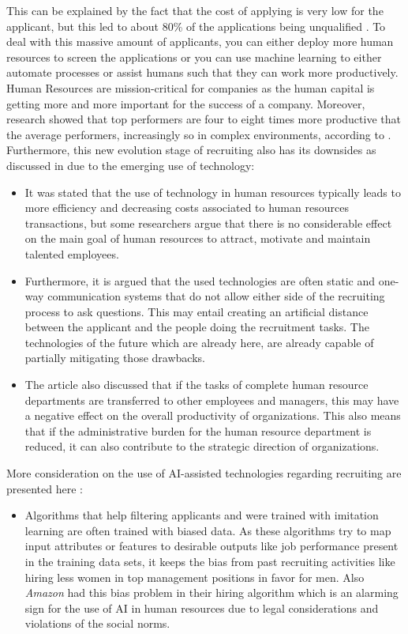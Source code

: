 \documentclass[draft,final]{thesisclass} %
\begin{document}
\begin{enumerate}
    This can be explained by the fact that the cost of applying is very low for the applicant, but this led to about 80\% of the applications being unqualified \cite[4]{ai_recruiting}.
    To deal with this massive amount of applicants, you can either deploy more human resources to screen the applications or you can use machine learning to either automate processes or assist humans such that they can work more productively.
    Human Resources are mission-critical for companies as the human capital is getting more and more important for the success of a company.
    Moreover, research showed that top performers are four to eight times more productive that the average performers, increasingly so in complex environments, according to \cite[4]{ai_recruiting}.
    Furthermore, this new evolution stage of recruiting also has its downsides as discussed in \cite[4-5]{challenges_opportunities_hr} due to the emerging use of technology:
    \begin{itemize}
        \item It was stated that the use of technology in human resources typically leads to more efficiency and decreasing costs associated to human resources transactions, but some researchers argue that there is no considerable effect on the main goal of human resources to attract, motivate and maintain talented employees. 
        \item Furthermore, it is argued that the used technologies are often static and one-way communication systems that do not allow either side of the recruiting process to ask questions. This may entail creating an artificial distance between the applicant and the people doing the recruitment tasks. The technologies of the future which are already here, are already capable of partially mitigating those drawbacks.
        \item The article also discussed that if the tasks of complete human resource departments are transferred to other employees and managers, this may have a negative effect on the overall productivity of organizations. This also means that if the administrative burden for the human resource department is reduced, it can also contribute to the strategic direction of organizations.
    \end{itemize}
    More consideration on the use of AI-assisted technologies regarding recruiting are presented here \cite[2-4]{ai_in_hr_management}:
    \begin{itemize}
        \item Algorithms that help filtering applicants and were trained with imitation learning are often trained with biased data. As these algorithms try to map input attributes or features to desirable outputs like job performance present in the training data sets, it keeps the bias from past recruiting activities like hiring less women in top management positions in favor for men. Also \textit{Amazon} had this bias problem in their hiring algorithm which is an alarming sign for the use of AI in human resources due to legal considerations and violations of the social norms.

\end{itemize}
\end{enumerate}
\end{document}
